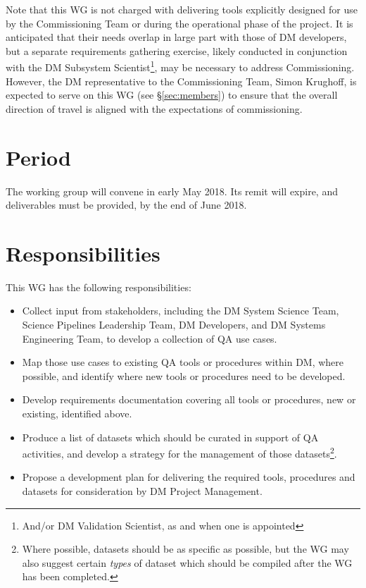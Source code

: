 \documentclass[DM,lsstdraft,toc]{lsstdoc}
\begin{document}
Note that this WG is not charged with delivering tools explicitly designed for
use by the Commissioning Team or during the operational phase of the project.
It is anticipated that their needs overlap in large part with those of DM
developers, but a separate requirements gathering exercise, likely conducted
in conjunction with the DM Subsystem Scientist\footnote{And/or DM Validation
Scientist, as and when one is appointed}, may be necessary to address
Commissioning. However, the DM representative to the Commissioning Team, Simon
Krughoff, is expected to serve on this WG (see \S\ref{sec:members}) to ensure
that the overall direction of travel is aligned with the expectations of
commissioning.

\section{Period}
\label{sec:period}

The working group will convene in early May 2018. Its remit will expire, and
deliverables must be provided, by the end of June 2018.

\section{Responsibilities}

This WG has the following responsibilities:

\begin{itemize}

  \item{Collect input from stakeholders, including the DM System Science Team,
  Science Pipelines Leadership Team, DM Developers, and DM Systems Engineering
  Team, to develop a collection of QA use cases.}

  \item{Map those use cases to existing QA tools or procedures within DM,
  where possible, and identify where new tools or procedures need to be
  developed.}

  \item{Develop requirements documentation covering all tools or procedures,
  new or existing, identified above.}

  \item{Produce a list of datasets which should be curated in support of QA
  activities, and develop a strategy for the management of those
  datasets\footnote{Where possible, datasets should be as specific as
  possible, but the WG may also suggest certain \textit{types} of dataset
  which should be compiled after the WG has been completed.}.}

  \item{Propose a development plan for delivering the required tools,
  procedures and datasets for consideration by DM Project Management.}

\end{itemize}
\end{document}
